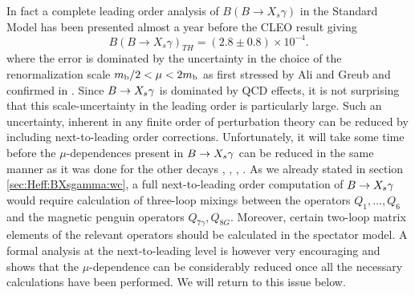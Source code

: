 In fact a complete leading order analysis of $B(B \to
X_s\gamma)$ in the Standard Model has been presented almost a year
before the CLEO result giving \cite{BMMP:94}
\begin{equation}
B(B \to X_s\gamma)_{TH} = (2.8 \pm 0.8) \times 10^{-4}.
\label{theo}
\end{equation}
where the error is dominated by the uncertainty in the choice of the
renormalization scale $m_{\rm b}/2<\mu<2 m_{\rm b}$ as first stressed by Ali and
Greub \cite{aligreub:93} and confirmed in \cite{BMMP:94}. Since $B \to X_s \gamma$ is
dominated by QCD effects, it is not surprising that this
scale-uncertainty in the leading order is particularly large.  Such an
uncertainty, inherent in any finite order of perturbation theory can be
reduced by including next-to-leading order corrections.  Unfortunately,
it will take some time before the $\mu$-dependences present in $B \to X_s \gamma$
can be reduced in the same manner as it was done for the other decays
\cite{burasjaminweisz:90}, \cite{buchallaburas:93b},
\cite{buchallaburas:94}, \cite{herrlichnierste:93}.  As we already
stated in section \ref{sec:Heff:BXsgamma:wc}, a full next-to-leading
order computation of $B \to X_s \gamma$ would require calculation of three-loop
mixings between the operators $Q_1,\ldots,Q_6$ and the magnetic penguin
operators $Q_{7\gamma},Q_{8G}$.
Moreover, certain two-loop matrix elements of the relevant operators
should be calculated in the spectator model.  A formal analysis at the
next-to-leading level \cite{BMMP:94} is however very encouraging and
shows that the $\mu$-dependence can be considerably reduced once all
the necessary calculations have been performed.  We will return to this
issue below.

